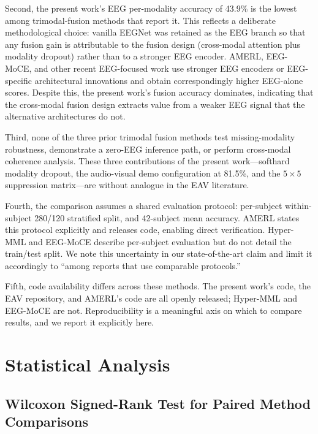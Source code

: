 Second, the present work's EEG per-modality accuracy of 43.9\% is the lowest among trimodal-fusion methods that report it. This reflects a deliberate methodological choice: vanilla EEGNet \cite{Lawhern2018EEGNet} was retained as the EEG branch so that any fusion gain is attributable to the fusion design (cross-modal attention plus modality dropout) rather than to a stronger EEG encoder. AMERL, EEG-MoCE, and other recent EEG-focused work use stronger EEG encoders or EEG-specific architectural innovations and obtain correspondingly higher EEG-alone scores. Despite this, the present work's fusion accuracy dominates, indicating that the cross-modal fusion design extracts value from a weaker EEG signal that the alternative architectures do not.

Third, none of the three prior trimodal fusion methods test missing-modality robustness, demonstrate a zero-EEG inference path, or perform cross-modal coherence analysis. These three contributions of the present work---softhard modality dropout, the audio-visual demo configuration at 81.5\%, and the $5\times5$ suppression matrix---are without analogue in the EAV literature.

Fourth, the comparison assumes a shared evaluation protocol: per-subject within-subject 280/120 stratified split, and 42-subject mean accuracy. AMERL \cite{Yin2024AMERL} states this protocol explicitly and releases code, enabling direct verification. Hyper-MML \cite{Kang2025HyperMML} and EEG-MoCE \cite{Anon2026EEGMoCE} describe per-subject evaluation but do not detail the train/test split. We note this uncertainty in our state-of-the-art claim and limit it accordingly to ``among reports that use comparable protocols.''

Fifth, code availability differs across these methods. The present work's code, the EAV repository, and AMERL's code are all openly released; Hyper-MML and EEG-MoCE are not. Reproducibility is a meaningful axis on which to compare results, and we report it explicitly here.

\section{Statistical Analysis}
\label{sec:statistical_analysis}

\subsection{Wilcoxon Signed-Rank Test for Paired Method Comparisons}

